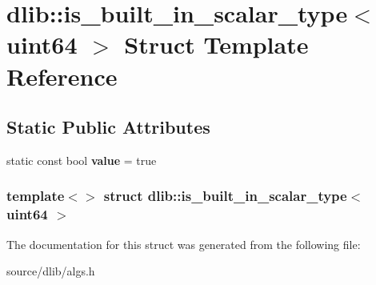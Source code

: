 \hypertarget{structdlib_1_1is__built__in__scalar__type_3_01uint64_01_4}{
\section{dlib::is\_\-built\_\-in\_\-scalar\_\-type$<$ uint64 $>$ Struct Template Reference}
\label{structdlib_1_1is__built__in__scalar__type_3_01uint64_01_4}
}
\subsection*{Static Public Attributes}
\begin{DoxyCompactItemize}
\item 
\hypertarget{structdlib_1_1is__built__in__scalar__type_3_01uint64_01_4_ad3e33339cc71c9116f070cd7e1c49e31}{
static const bool {\bfseries value} = true}
\label{structdlib_1_1is__built__in__scalar__type_3_01uint64_01_4_ad3e33339cc71c9116f070cd7e1c49e31}

\end{DoxyCompactItemize}
\subsubsection*{template$<$$>$ struct dlib::is\_\-built\_\-in\_\-scalar\_\-type$<$ uint64 $>$}



The documentation for this struct was generated from the following file:\begin{DoxyCompactItemize}
\item 
source/dlib/algs.h\end{DoxyCompactItemize}
